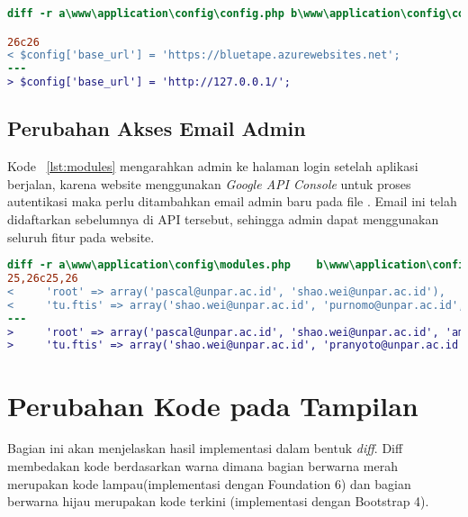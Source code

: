 \begin{lstlisting}[language=diff, caption=Perubahan file /config/config.php,  basicstyle=\ttfamily, frame=single,
columns=fullflexible, keepspaces=true, breaklines=true, label={lst:config}]
diff -r a\www\application\config\config.php b\www\application\config\config.php

26c26
< $config['base_url'] = 'https://bluetape.azurewebsites.net';
---
> $config['base_url'] = 'http://127.0.0.1/';
\end{lstlisting}

\subsection{Perubahan Akses Email Admin}

Kode ~\ref{lst:modules} mengarahkan admin ke halaman login setelah aplikasi berjalan, karena website menggunakan \textit{Google API Console} untuk proses autentikasi maka perlu ditambahkan email admin baru pada file . Email ini telah didaftarkan sebelumnya di API tersebut, sehingga admin dapat menggunakan seluruh fitur pada website. \\

\begin{lstlisting}[language=diff, caption=Perubahan file /config/modules.php,  basicstyle=\ttfamily, frame=single,
columns=fullflexible, keepspaces=true, breaklines=true, label={lst:modules}]
diff -r a\www\application\config\modules.php 	b\www\application\config\modules.php
25,26c25,26
<     'root' => array('pascal@unpar.ac.id', 'shao.wei@unpar.ac.id'),
<     'tu.ftis' => array('shao.wei@unpar.ac.id', 'purnomo@unpar.ac.id', 'walip@unpar.ac.id'),
---
>     'root' => array('pascal@unpar.ac.id', 'shao.wei@unpar.ac.id', 'amihapsahapsa@gmail.com'),
>     'tu.ftis' => array('shao.wei@unpar.ac.id', 'pranyoto@unpar.ac.id', 'walip@unpar.ac.id'),

\end{lstlisting}

\section{Perubahan Kode pada Tampilan}

Bagian ini akan menjelaskan hasil implementasi dalam bentuk \textit{diff}. Diff membedakan kode berdasarkan warna dimana bagian berwarna merah merupakan kode lampau(implementasi dengan Foundation 6) dan bagian berwarna hijau merupakan kode terkini  (implementasi dengan Bootstrap 4).

